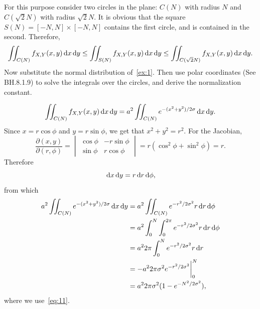 \documentclass[lectures]{subfiles}
\begin{document}
\begin{exercise}
For this purpose consider two circles in the plane: $C(N)$ with radius $N$ and $C(\sqrt 2 N)$ with radius $\sqrt 2 N$.
It is obvious that the square $S(N) = [-N,N]\times[-N,N]$ contains the first circle, and is contained in the second.
Therefore,
\begin{equation}
  \label{eq:13}
  \iint_{C(N)}f_{X,Y}(x,y) \,\textrm{d}x\,\textrm{d}y \leq
  \iint_{S(N)}f_{X,Y}(x,y) \,\textrm{d}x\,\textrm{d}y \leq
  \iint_{C(\sqrt 2 N)}f_{X,Y}(x,y) \,\textrm{d}x\,\textrm{d}y.
\end{equation}
Now substitute the normal distribution of~\cref{ex:1}.
Then use polar coordinates (See BH.8.1.9) to solve the integrals over the circles, and derive the normalization constant.
\begin{solution}
\begin{equation}
\label{eq:14}
  \iint_{C(N)}f_{X,Y}(x,y) \,\textrm{d}x\,\textrm{d}y =
a^{2}  \iint_{C(N)} e^{-(x^{2}+y^{2})/2\sigma} \,\textrm{d}x\,\textrm{d}y.
\end{equation}
Since  $x = r \cos \phi$ and $y=r\sin \phi$, we get that $x^2+y^2 = r^{2}$. For the Jacobian,
\begin{equation}
  \label{eq:15}
  \frac{\partial(x, y)}{\partial(r,\phi)} =
  \begin{vmatrix}
    \cos \phi  & -r\sin \phi \\
    \sin \phi  & r\cos \phi
  \end{vmatrix}
= r(\cos^{2} \phi + \sin^2 \phi) = r.
\end{equation}
Therefore
\begin{equation}
\label{eq:16}
\,\textrm{d}x \,\textrm{d}y = r \,\textrm{d}r \,\textrm{d}\phi,
\end{equation}
from which
\begin{align}
a^{2}  \iint_{C(N)} e^{-(x^{2}+y^{2})/2\sigma} \,\textrm{d}x\,\textrm{d}y
&=a^{2}  \iint_{C(N)} e^{-r^{2}/2\sigma^{2}} r \,\textrm{d}r\,\textrm{d}\phi \\
&= a^{2}  \int_{0}^{N} \int_{0}^{2\pi} e^{-r^{2}/2\sigma^{2}} r \,\textrm{d}r\,\textrm{d}\phi \\
&= a^{2}  2\pi \int_{0}^{N}  e^{-r^{2}/2\sigma^{2}} r \,\textrm{d}r \\
&= - a^{2}  2\pi{\sigma^{2}} e^{-r^{2}/2\sigma^{2}}\biggr|_{0}^{N} \\
&= a^{2}2\pi{\sigma^{2}} (1-e^{-N^{2}/2\sigma^{2}}),
\end{align}
where we use~\cref{eq:11}.



\end{solution}
\end{exercise}
\end{document}
